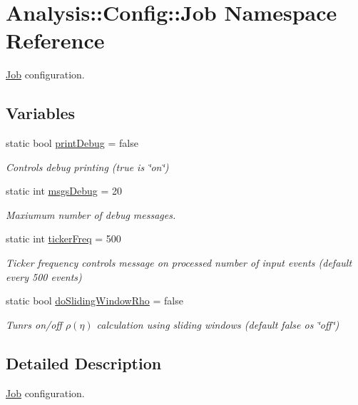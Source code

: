 \hypertarget{namespaceAnalysis_1_1Config_1_1Job}{}\section{Analysis\+:\+:Config\+:\+:Job Namespace Reference}
\label{namespaceAnalysis_1_1Config_1_1Job}


\hyperlink{namespaceAnalysis_1_1Config_1_1Job}{Job} configuration.  


\subsection*{Variables}
\begin{DoxyCompactItemize}
\item 
static bool \hyperlink{namespaceAnalysis_1_1Config_1_1Job_aabd902531ff651c92a08fa9f986e2046}{print\+Debug} = false
\begin{DoxyCompactList}\small\item\em Controls debug printing ({\ttfamily true} is \char`\"{}on\char`\"{}) \end{DoxyCompactList}\item 
static int \hyperlink{namespaceAnalysis_1_1Config_1_1Job_a1cbee93d8fe720cde075eb23877eb114}{msgs\+Debug} = 20
\begin{DoxyCompactList}\small\item\em Maxiumum number of debug messages. \end{DoxyCompactList}\item 
static int \hyperlink{namespaceAnalysis_1_1Config_1_1Job_a5db682379b8905ddba5cc6b4093555d2}{ticker\+Freq} = 500
\begin{DoxyCompactList}\small\item\em Ticker frequency controls message on processed number of input events (default every 500 events) \end{DoxyCompactList}\item 
static bool \hyperlink{namespaceAnalysis_1_1Config_1_1Job_a745c1fecd2479d21b556bfb812e3805b}{do\+Sliding\+Window\+Rho} = false
\begin{DoxyCompactList}\small\item\em Tunrs on/off $ \rho(\eta) $ calculation using sliding windows (default {\ttfamily false} os \char`\"{}off\char`\"{}) \end{DoxyCompactList}\end{DoxyCompactItemize}


\subsection{Detailed Description}
\hyperlink{namespaceAnalysis_1_1Config_1_1Job}{Job} configuration. 

